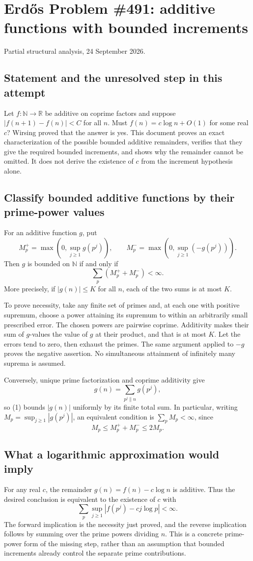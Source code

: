 \section{Erd\H{o}s Problem \#491: additive functions with bounded increments}
\noindent Partial structural analysis, 24 September 2026.

\subsection*{Statement and the unresolved step in this attempt}
Let $f:\mathbb N\to\mathbb R$ be additive on coprime factors and suppose $|f(n+1)-f(n)|<C$ for all $n$. Must $f(n)=c\log n+O(1)$ for some real $c$? Wirsing proved that the answer is yes. This document proves an exact characterization of the possible bounded additive remainders, verifies that they give the required bounded increments, and shows why the remainder cannot be omitted. It does not derive the existence of $c$ from the increment hypothesis alone.

\subsection*{Classify bounded additive functions by their prime-power values}
For an additive function $g$, put
\[M_p^+=\max\left(0,\sup_{j\ge1}g(p^j)\right),\qquad
M_p^-=\max\left(0,\sup_{j\ge1}(-g(p^j))\right).
\]
Then $g$ is bounded on $\mathbb N$ if and only if
\[\sum_p(M_p^++M_p^-)<\infty.\tag{1}\]
More precisely, if $|g(n)|\le K$ for all $n$, each of the two sums is at most $K$.

To prove necessity, take any finite set of primes and, at each one with positive supremum, choose a power attaining its supremum to within an arbitrarily small prescribed error. The chosen powers are pairwise coprime. Additivity makes their sum of $g$-values the value of $g$ at their product, and that is at most $K$. Let the errors tend to zero, then exhaust the primes. The same argument applied to $-g$ proves the negative assertion. No simultaneous attainment of infinitely many suprema is assumed.

Conversely, unique prime factorization and coprime additivity give
\[g(n)=\sum_{p^j\parallel n}g(p^j),
\]
so (1) bounds $|g(n)|$ uniformly by its finite total sum. In particular, writing $M_p=\sup_{j\ge1}|g(p^j)|$, an equivalent condition is $\sum_p M_p<\infty$, since
\[M_p\le M_p^++M_p^-\le2M_p.
\]

\subsection*{What a logarithmic approximation would imply}
For any real $c$, the remainder $g(n)=f(n)-c\log n$ is additive. Thus the desired conclusion is equivalent to the existence of $c$ with
\[\sum_p\sup_{j\ge1}|f(p^j)-cj\log p|<\infty.\tag{2}\]
The forward implication is the necessity just proved, and the reverse implication follows by summing over the prime powers dividing $n$. This is a concrete prime-power form of the missing step, rather than an assumption that bounded increments already control the separate prime contributions.

